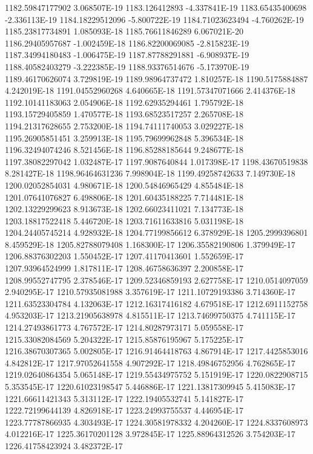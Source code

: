 1182.59847177902  3.068507E-19
1183.126412893  -4.337841E-19
1183.65435400698  -2.336113E-19
1184.18229512096  -5.800722E-19
1184.71023623494  -4.760262E-19
1185.23817734891  1.085093E-18
1185.76611846289  6.067021E-20
1186.29405957687  -1.002459E-18
1186.82200069085  -2.815823E-19
1187.34994180483  -1.006475E-19
1187.87788291881  -6.908937E-19
1188.40582403279  -3.222385E-19
1188.93376514676  -5.173970E-19
1189.46170626074  3.729819E-19
1189.98964737472  1.810257E-18
1190.5175884887  4.242019E-18
1191.04552960268  4.640665E-18
1191.57347071666  2.414376E-18
1192.10141183063  2.054906E-18
1192.62935294461  1.795792E-18
1193.15729405859  1.470577E-18
1193.68523517257  2.265708E-18
1194.21317628655  2.753200E-18
1194.74111740053  3.029227E-18
1195.26905851451  3.259913E-18
1195.79699962848  5.396534E-18
1196.32494074246  8.521456E-18
1196.85288185644  9.248677E-18
1197.38082297042  1.032487E-17
1197.9087640844  1.017398E-17
1198.43670519838  8.281427E-18
1198.96464631236  7.998904E-18
1199.49258742633  7.149730E-18
1200.02052854031  4.980671E-18
1200.54846965429  4.855484E-18
1201.07641076827  6.498806E-18
1201.60435188225  7.714481E-18
1202.13229299623  8.913673E-18
1202.66023411021  7.134773E-18
1203.18817522418  5.446720E-18
1203.71611633816  5.031198E-18
1204.24405745214  4.928932E-18
1204.77199856612  6.378929E-18
1205.2999396801  8.459529E-18
1205.82788079408  1.168300E-17
1206.35582190806  1.379949E-17
1206.88376302203  1.550452E-17
1207.41170413601  1.552659E-17
1207.93964524999  1.817811E-17
1208.46758636397  2.200858E-17
1208.99552747795  2.378546E-17
1209.52346859193  2.627758E-17
1210.0514097059  2.940295E-17
1210.57935081988  3.357619E-17
1211.10729193386  3.714360E-17
1211.63523304784  4.132063E-17
1212.16317416182  4.679518E-17
1212.6911152758  4.953203E-17
1213.21905638978  4.815511E-17
1213.74699750375  4.741115E-17
1214.27493861773  4.767572E-17
1214.80287973171  5.059558E-17
1215.33082084569  5.204322E-17
1215.85876195967  5.175225E-17
1216.38670307365  5.002805E-17
1216.91464418763  4.867914E-17
1217.4425853016  4.842812E-17
1217.97052641558  4.907292E-17
1218.49846752956  4.762865E-17
1219.02640864354  5.065148E-17
1219.55434975752  5.151919E-17
1220.0822908715  5.353545E-17
1220.61023198547  5.446886E-17
1221.13817309945  5.415083E-17
1221.66611421343  5.313112E-17
1222.19405532741  5.141827E-17
1222.72199644139  4.826918E-17
1223.24993755537  4.446954E-17
1223.77787866935  4.303493E-17
1224.30581978332  4.204260E-17
1224.8337608973  4.012216E-17
1225.36170201128  3.972845E-17
1225.88964312526  3.754203E-17
1226.41758423924  3.482372E-17
